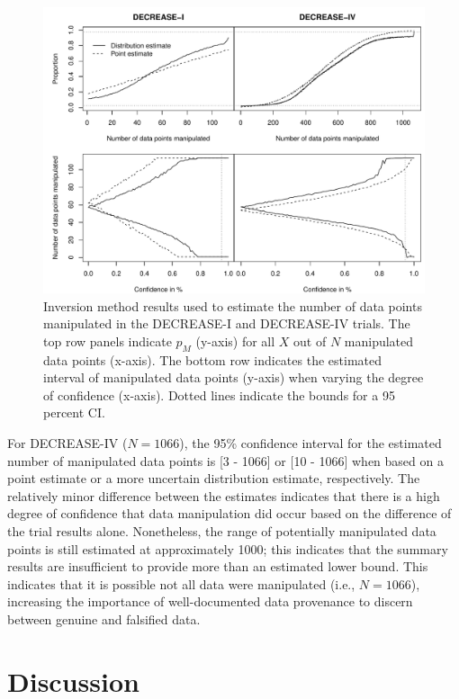 \documentclass[]{article}
\begin{document}
\begin{figure}

{\centering \includegraphics[width=0.8\linewidth]{../figures/fig3} 

}

\caption{Inversion method results used to estimate the number of data points manipulated in the DECREASE-I and DECREASE-IV trials. The top row panels indicate $p_M$ (y-axis) for all $X$ out of $N$ manipulated data points (x-axis). The bottom row indicates the estimated interval of manipulated data points (y-axis) when varying the degree of confidence (x-axis). Dotted lines indicate the bounds for a 95 percent CI.}\label{fig:figure 3}
\end{figure}

For DECREASE-IV (\(N=1066\)), the 95\% confidence interval for the
estimated number of manipulated data points is {[}3 - 1066{]} or {[}10 -
1066{]} when based on a point estimate or a more uncertain distribution
estimate, respectively. The relatively minor difference between the
estimates indicates that there is a high degree of confidence that data
manipulation did occur based on the difference of the trial results
alone. Nonetheless, the range of potentially manipulated data points is
still estimated at approximately 1000; this indicates that the summary
results are insufficient to provide more than an estimated lower bound.
This indicates that it is possible not all data were manipulated (i.e.,
\(N=1066\)), increasing the importance of well-documented data
provenance to discern between genuine and falsified data.

\section{Discussion}\label{discussion}
\end{document}

